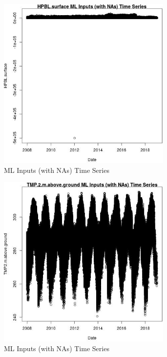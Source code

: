 \begin{figure} 
\centering  
\includegraphics[width=0.77\textwidth]{Code_Outputs/Report_ML_input_PM25_Step4_part_e_de_duplicated_aves_compiled_2019-05-21wNAs_HPBLsurfacevDate.jpg} 
\caption{\label{fig:Report_ML_input_PM25_Step4_part_e_de_duplicated_aves_compiled_2019-05-21wNAsHPBLsurfacevDate}ML Inputs (with NAs) Time Series} 
\end{figure} 
 

\begin{figure} 
\centering  
\includegraphics[width=0.77\textwidth]{Code_Outputs/Report_ML_input_PM25_Step4_part_e_de_duplicated_aves_compiled_2019-05-21wNAs_TMP2mabovegroundvDate.jpg} 
\caption{\label{fig:Report_ML_input_PM25_Step4_part_e_de_duplicated_aves_compiled_2019-05-21wNAsTMP2mabovegroundvDate}ML Inputs (with NAs) Time Series} 
\end{figure} 
 

